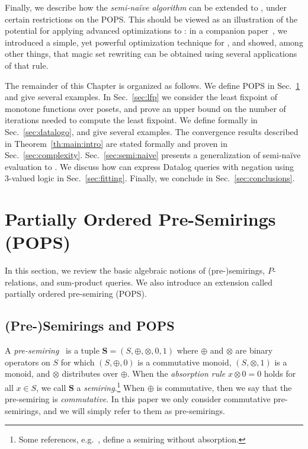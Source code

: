 Finally, we describe how the {\em semi-na\"ive algorithm} can be
extended to \datalogo, under certain restrictions on the POPS.  This
should be viewed as an illustration of the potential for applying
advanced optimizations to \datalogo: in a companion
paper~\cite{DBLP:conf/sigmod/WangK0PS22}, we introduced a simple, yet
powerful optimization technique for \datalogo, and showed, among other
things, that magic set rewriting can be obtained using several
applications of that rule.

The remainder of this Chapter is organized as follows. 
We define POPS in Sec.~\ref{sec:pops} and give several examples.
In Sec.~\ref{sec:lfp} we consider the least fixpoint of monotone
functions over posets, and prove an upper bound on the number of
iterations needed to compute the least fixpoint.  We define \datalogo
formally in Sec.~\ref{sec:datalogo}, and give several examples.
The convergence results described in Theorem~\ref{th:main:intro} are
stated formally and proven in Sec.~\ref{sec:complexity}.
Sec.~\ref{sec:semi:naive} presents a generalization of semi-na\"ive
evaluation to \datalogo.  We discuss how \datalogo can express Datalog
queries with negation using 3-valued logic in
Sec.~\ref{sec:fitting}.  Finally, we conclude in
Sec.~\ref{sec:conclusions}.

\section{Partially Ordered Pre-Semirings (POPS)}
\label{sec:pops}

In this section, we review the basic algebraic notions of (pre-)semirings,
$P$-relations, and sum-product queries.
We also introduce an extension called partially ordered pre-semiring (POPS).

\subsection{(Pre-)Semirings and POPS}

\begin{defn}
A {\em pre-semiring}~\cite{semiring_book} is a tuple
$\bm S = (S, \oplus, \otimes, 0, 1)$ where $\oplus$ and $\otimes$ are
binary operators on $S$ for which $(S, \oplus, 0)$ is a commutative
monoid, $(S, \otimes, 1)$ is a monoid, and $\otimes$ distributes over
$\oplus$.
When the {\em absorption rule} $x \otimes 0 = 0$ holds
for all $x \in S$, we call $\bm S$ a {\em semiring}.\footnote{Some
  references, e.g.~\cite{DBLP:journals/ai/KohlasW08}, define a
  semiring without absorption.}
%
When $\oplus$ is commutative, then we say that the
pre-semiring is {\em commutative}.  In this paper we only consider
commutative pre-semirings, and we will simply refer to them as
pre-semirings.
\end{defn}

